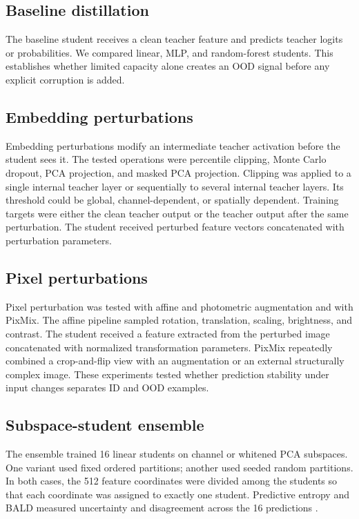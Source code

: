 \subsection{Baseline distillation}

\headingindent
The baseline student receives a clean teacher feature and predicts teacher
logits or probabilities. We compared linear, MLP, and random-forest students.
This establishes whether limited capacity alone creates an OOD signal before
any explicit corruption is added.

\subsection{Embedding perturbations}

\headingindent
Embedding perturbations modify an intermediate teacher activation before the
student sees it. The tested operations were percentile clipping, Monte Carlo
dropout, PCA projection, and masked PCA projection. Clipping was applied to a
single internal teacher layer or sequentially to several internal teacher layers. Its threshold could be global,
channel-dependent, or spatially dependent. Training targets were either the
clean teacher output or the teacher output after the same perturbation.
The student received perturbed feature vectors concatenated with perturbation parameters.

\subsection{Pixel perturbations}

\headingindent
Pixel perturbation was tested with affine and photometric augmentation and
with PixMix. The affine pipeline sampled rotation, translation, scaling,
brightness, and contrast. The student received a feature extracted from the
perturbed image concatenated with normalized transformation
parameters. PixMix repeatedly combined a crop-and-flip view with an
augmentation or an external structurally complex image. These experiments
tested whether prediction stability under input changes separates ID and OOD
examples.

\subsection{Subspace-student ensemble}

\headingindent
The ensemble trained 16 linear students on channel or whitened PCA subspaces.
One variant used fixed ordered partitions; another used seeded random
partitions. In both cases, the 512 feature coordinates were divided among the
students so that each coordinate was assigned to exactly one student.
Predictive entropy and BALD measured uncertainty and disagreement across the
16 predictions \cite{houlsby2011bald}.

